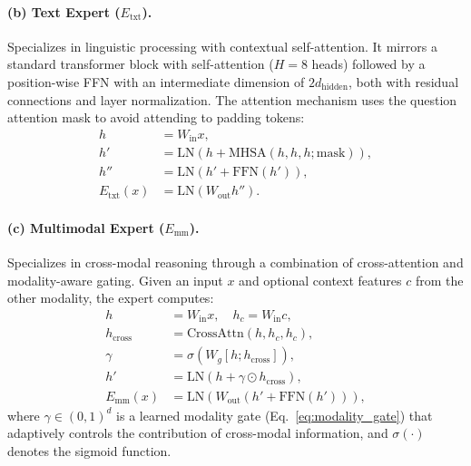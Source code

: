 \paragraph{(b) Text Expert ($E_{\text{txt}}$).}
Specializes in linguistic processing with contextual self-attention. It mirrors a standard transformer block with self-attention ($H = 8$ heads) followed by a position-wise FFN with an intermediate dimension of $2 d_{\text{hidden}}$, both with residual connections and layer normalization. The attention mechanism uses the question attention mask to avoid attending to padding tokens:
\begin{align}
    h &= W_{\text{in}} x, \\
    h' &= \text{LN}\!\left(h + \text{MHSA}(h, h, h; \text{mask})\right), \\
    h'' &= \text{LN}\!\left(h' + \text{FFN}(h')\right), \\
    E_{\text{txt}}(x) &= \text{LN}\!\left(W_{\text{out}} h''\right).
\end{align}

\paragraph{(c) Multimodal Expert ($E_{\text{mm}}$).}
Specializes in cross-modal reasoning through a combination of cross-attention and modality-aware gating. Given an input $x$ and optional context features $c$ from the other modality, the expert computes:
\begin{align}
    h &= W_{\text{in}} x, \quad h_c = W_{\text{in}} c, \\
    h_{\text{cross}} &= \text{CrossAttn}(h, h_c, h_c), \\
    \gamma &= \sigma\!\left(W_g [h; h_{\text{cross}}]\right), \label{eq:modality_gate} \\
    h' &= \text{LN}\!\left(h + \gamma \odot h_{\text{cross}}\right), \\
    E_{\text{mm}}(x) &= \text{LN}\!\left(W_{\text{out}}\!\left(h' + \text{FFN}(h')\right)\right),
\end{align}
where $\gamma \in (0, 1)^{d}$ is a learned modality gate (Eq.~\ref{eq:modality_gate}) that adaptively controls the contribution of cross-modal information, and $\sigma(\cdot)$ denotes the sigmoid function.

